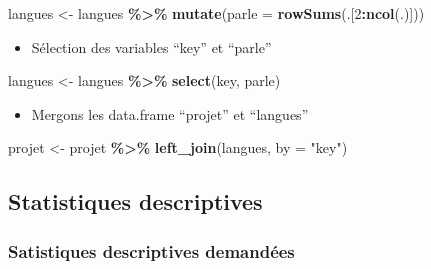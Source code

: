 \documentclass[
]{article}
\newenvironment{Shaded}{\begin{snugshade}}{\end{snugshade}}
\newcommand{\AttributeTok}[1]{\textcolor[rgb]{0.13,0.29,0.53}{#1}}
\newcommand{\DecValTok}[1]{\textcolor[rgb]{0.00,0.00,0.81}{#1}}
\newcommand{\FunctionTok}[1]{\textcolor[rgb]{0.13,0.29,0.53}{\textbf{#1}}}
\newcommand{\NormalTok}[1]{#1}
\newcommand{\OtherTok}[1]{\textcolor[rgb]{0.56,0.35,0.01}{#1}}
\newcommand{\SpecialCharTok}[1]{\textcolor[rgb]{0.81,0.36,0.00}{\textbf{#1}}}
\newcommand{\StringTok}[1]{\textcolor[rgb]{0.31,0.60,0.02}{#1}}
\providecommand{\tightlist}{%
  \setlength{\itemsep}{0pt}\setlength{\parskip}{0pt}}
\begin{document}
\begin{Shaded}
\begin{Highlighting}[]
\NormalTok{langues }\OtherTok{\textless{}{-}}\NormalTok{ langues }\SpecialCharTok{\%\textgreater{}\%}
  \FunctionTok{mutate}\NormalTok{(}\AttributeTok{parle =} \FunctionTok{rowSums}\NormalTok{(.[}\DecValTok{2}\SpecialCharTok{:}\FunctionTok{ncol}\NormalTok{(.)]))}
\end{Highlighting}
\end{Shaded}

\begin{itemize}
\tightlist
\item
  Sélection des variables ``key'' et ``parle''
\end{itemize}

\begin{Shaded}
\begin{Highlighting}[]
\NormalTok{langues }\OtherTok{\textless{}{-}}\NormalTok{ langues }\SpecialCharTok{\%\textgreater{}\%}
  \FunctionTok{select}\NormalTok{(key, parle)}
\end{Highlighting}
\end{Shaded}

\begin{itemize}
\tightlist
\item
  Mergons les data.frame ``projet'' et ``langues''
\end{itemize}

\begin{Shaded}
\begin{Highlighting}[]
\NormalTok{projet }\OtherTok{\textless{}{-}}\NormalTok{ projet }\SpecialCharTok{\%\textgreater{}\%}
  \FunctionTok{left\_join}\NormalTok{(langues, }\AttributeTok{by =} \StringTok{"key"}\NormalTok{)}
\end{Highlighting}
\end{Shaded}

\hypertarget{statistiques-descriptives}{%
\subsection{Statistiques descriptives}\label{statistiques-descriptives}}

\hypertarget{satistiques-descriptives-demanduxe9es}{%
\subsubsection{Satistiques descriptives
demandées}\label{satistiques-descriptives-demanduxe9es}}
\end{document}
